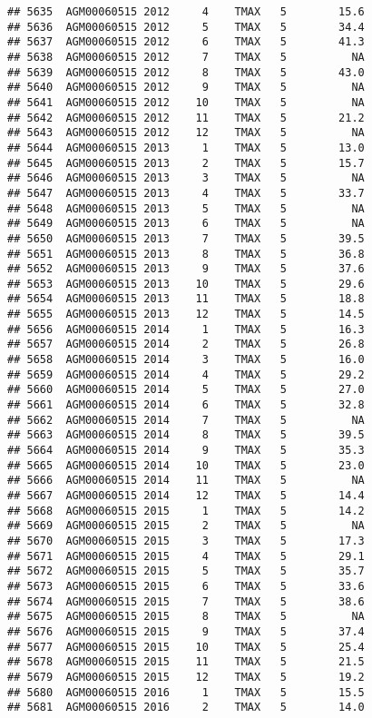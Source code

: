 \documentclass{article}\usepackage[]{graphicx}\usepackage[]{color}
\makeatletter
\newenvironment{kframe}{%
 \def\at@end@of@kframe{}%
 \ifinner\ifhmode%
  \def\at@end@of@kframe{\end{minipage}}%
  \begin{minipage}{\columnwidth}%
 \fi\fi%
 \def\FrameCommand##1{\hskip\@totalleftmargin \hskip-\fboxsep
 \colorbox{shadecolor}{##1}\hskip-\fboxsep
     \hskip-\linewidth \hskip-\@totalleftmargin \hskip\columnwidth}%
 \MakeFramed {\advance\hsize-\width
   \@totalleftmargin\z@ \linewidth\hsize
   \@setminipage}}%
 {\par\unskip\endMakeFramed%
 \at@end@of@kframe}
\newenvironment{knitrout}{}{} %
\makeatother
\begin{document}
\begin{knitrout}
\begin{kframe}
\begin{verbatim}
## 5635  AGM00060515 2012     4    TMAX   5        15.6
## 5636  AGM00060515 2012     5    TMAX   5        34.4
## 5637  AGM00060515 2012     6    TMAX   5        41.3
## 5638  AGM00060515 2012     7    TMAX   5          NA
## 5639  AGM00060515 2012     8    TMAX   5        43.0
## 5640  AGM00060515 2012     9    TMAX   5          NA
## 5641  AGM00060515 2012    10    TMAX   5          NA
## 5642  AGM00060515 2012    11    TMAX   5        21.2
## 5643  AGM00060515 2012    12    TMAX   5          NA
## 5644  AGM00060515 2013     1    TMAX   5        13.0
## 5645  AGM00060515 2013     2    TMAX   5        15.7
## 5646  AGM00060515 2013     3    TMAX   5          NA
## 5647  AGM00060515 2013     4    TMAX   5        33.7
## 5648  AGM00060515 2013     5    TMAX   5          NA
## 5649  AGM00060515 2013     6    TMAX   5          NA
## 5650  AGM00060515 2013     7    TMAX   5        39.5
## 5651  AGM00060515 2013     8    TMAX   5        36.8
## 5652  AGM00060515 2013     9    TMAX   5        37.6
## 5653  AGM00060515 2013    10    TMAX   5        29.6
## 5654  AGM00060515 2013    11    TMAX   5        18.8
## 5655  AGM00060515 2013    12    TMAX   5        14.5
## 5656  AGM00060515 2014     1    TMAX   5        16.3
## 5657  AGM00060515 2014     2    TMAX   5        26.8
## 5658  AGM00060515 2014     3    TMAX   5        16.0
## 5659  AGM00060515 2014     4    TMAX   5        29.2
## 5660  AGM00060515 2014     5    TMAX   5        27.0
## 5661  AGM00060515 2014     6    TMAX   5        32.8
## 5662  AGM00060515 2014     7    TMAX   5          NA
## 5663  AGM00060515 2014     8    TMAX   5        39.5
## 5664  AGM00060515 2014     9    TMAX   5        35.3
## 5665  AGM00060515 2014    10    TMAX   5        23.0
## 5666  AGM00060515 2014    11    TMAX   5          NA
## 5667  AGM00060515 2014    12    TMAX   5        14.4
## 5668  AGM00060515 2015     1    TMAX   5        14.2
## 5669  AGM00060515 2015     2    TMAX   5          NA
## 5670  AGM00060515 2015     3    TMAX   5        17.3
## 5671  AGM00060515 2015     4    TMAX   5        29.1
## 5672  AGM00060515 2015     5    TMAX   5        35.7
## 5673  AGM00060515 2015     6    TMAX   5        33.6
## 5674  AGM00060515 2015     7    TMAX   5        38.6
## 5675  AGM00060515 2015     8    TMAX   5          NA
## 5676  AGM00060515 2015     9    TMAX   5        37.4
## 5677  AGM00060515 2015    10    TMAX   5        25.4
## 5678  AGM00060515 2015    11    TMAX   5        21.5
## 5679  AGM00060515 2015    12    TMAX   5        19.2
## 5680  AGM00060515 2016     1    TMAX   5        15.5
## 5681  AGM00060515 2016     2    TMAX   5        14.0

\end{verbatim}
\end{kframe}
\end{knitrout}
\end{document}
